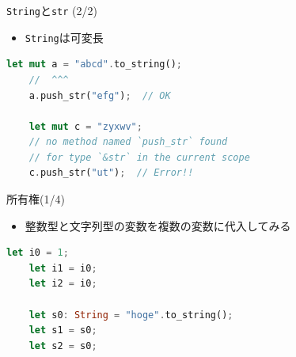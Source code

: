 \documentclass[cjk,dvipdfmx,10pt,compress,fragile%
hyperref={bookmarks=true,bookmarksnumbered=true,bookmarksopen=false,%
colorlinks=false,%
pdftitle={第 134 回 関西 Debian 勉強会},%
pdfauthor={小林},%
pdfsubject={資料},%
}]{beamer}
\newenvironment{commandline}%
{\VerbatimEnvironment
  \begin{Sbox}\begin{minipage}{0.9\hsize}\begin{fontsize}{8}{8} \color{white} \begin{BVerbatim}}%
{\end{BVerbatim}\end{fontsize}\end{minipage}\end{Sbox}
  \setlength{\fboxsep}{8pt}

\vspace{6pt}%
\fcolorbox{white}{black}{\TheSbox}

\vspace{3pt}%
}
\begin{document}
\begin{frame}[t,fragile]{\texttt{String}と\texttt{str} (2/2)}
\begin{itemize}
 \item \texttt{String}は可変長
\end{itemize}
\begin{lstlisting}[language=Rust,style=boxed,style=colouredRust]
    let mut a = "abcd".to_string();
    //  ^^^
    a.push_str("efg");  // OK

    let mut c = "zyxwv";
    // no method named `push_str` found
    // for type `&str` in the current scope
    c.push_str("ut");  // Error!! \end{lstlisting}
\end{frame}


\begin{frame}[t,fragile]{所有権(1/4)}
 \begin{itemize}
  \item 整数型と文字列型の変数を複数の変数に代入してみる
	\begin{itemize}
	\end{itemize}
 \end{itemize}
 \begin{lstlisting}[language=Rust,style=boxed,style=colouredRust]
    let i0 = 1;
    let i1 = i0;
    let i2 = i0;

    let s0: String = "hoge".to_string();
    let s1 = s0;
    let s2 = s0;\end{lstlisting}
\end{frame}
\end{document}
